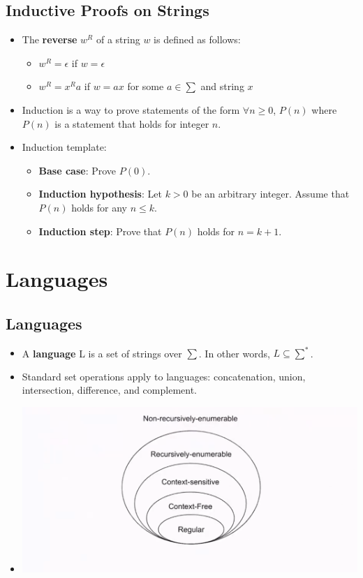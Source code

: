 \subsection{Inductive Proofs on Strings}
\begin{itemize}
    \item The \textbf{reverse} $w^R$ of a string $w$ is defined as follows:
        \begin{itemize}
            \item $w^R = \epsilon$ if $w = \epsilon$
            \item $w^R = x^Ra$ if $w = ax$ for some $a \in \sum$ and string $x$
        \end{itemize}
    \item Induction is a way to prove statements of the form $\forall n \geq 0$, $P(n)$ where $P(n)$ is a statement that holds for integer $n$.
    \item Induction template:
        \begin{itemize}
            \item \textbf{Base case}: Prove $P(0)$.
            \item \textbf{Induction hypothesis}: Let $k > 0$ be an arbitrary integer. Assume that $P(n)$ holds for any $n \leq k$.
            \item \textbf{Induction step}: Prove that $P(n)$ holds for $n = k + 1$.
        \end{itemize}
\end{itemize}

\section{Languages}

\subsection{Languages}
\begin{itemize}
    \item A \textbf{language} L is a set of strings over $\sum$. In other words, $L \subseteq \sum^{\ast}$.
    \item Standard set operations apply to languages: concatenation, union, intersection, difference, and complement.
    \item[] \includegraphics[width=\textwidth]{lecture1/images/chomsky-hierarchy.png}
\end{itemize}

